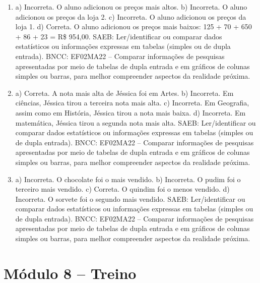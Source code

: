 \begin{enumerate}
\item
a) Incorreta. O aluno adicionou os preços mais altos.
b) Incorreta. O aluno adicionou os preços da loja 2.
c) Incorreta. O aluno adicionou os preços da loja 1.
d) Correta. O aluno adicionou os preços mais baixos: 125 + 70 + 650 + 86 + 23 = R\$ 954,00.
SAEB: Ler/identificar ou comparar dados estatísticos ou
informações expressas em tabelas (simples ou de dupla entrada).
BNCC: EF02MA22 -- Comparar informações de pesquisas apresentadas por meio
de tabelas de dupla entrada e em gráficos de colunas simples ou barras, para melhor
compreender aspectos da realidade próxima.

\item
a) Correta. A nota mais alta de Jéssica foi em Artes.
b) Incorreta. Em ciências, Jéssica tirou a terceira nota mais alta.
c) Incorreta. Em Geografia, assim como em História, Jéssica tirou a nota mais baixa.
d) Incorreta. Em matemática, Jéssica tirou a segunda nota mais alta.
SAEB: Ler/identificar ou comparar dados estatísticos ou
informações expressas em tabelas (simples ou de dupla entrada).
BNCC: EF02MA22 -- Comparar informações de pesquisas apresentadas por meio
de tabelas de dupla entrada e em gráficos de colunas simples ou barras, para melhor
compreender aspectos da realidade próxima.

\item
a) Incorreta. O chocolate foi o mais vendido.
b) Incorreta. O pudim foi o terceiro mais vendido.
c) Correta. O quindim foi o menos vendido.
d) Incorreta. O sorvete foi o segundo mais vendido.
SAEB: Ler/identificar ou comparar dados estatísticos ou
informações expressas em tabelas (simples ou de dupla entrada).
BNCC: EF02MA22 -- Comparar informações de pesquisas apresentadas por meio
de tabelas de dupla entrada e em gráficos de colunas simples ou barras, para melhor
compreender aspectos da realidade próxima.

\end{enumerate}

\section*{Módulo 8 – Treino}

